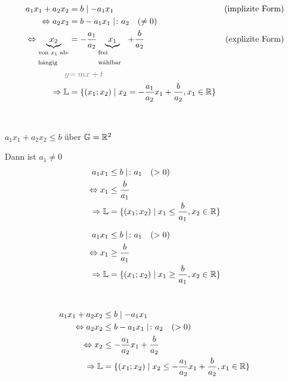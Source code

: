 \begin{enumerate}[A)]
	\clearpage
	\begin{align*}
	a_1x_1 + a_2x_2 &= b \mid - a_1x_1 &\text{(implizite Form)}\\
	\Leftrightarrow a_2x_2 &= b - a_1x_1 \mid \colon a_2\quad(\ne0)\\
	\Leftrightarrow \underbrace{x_2}_\text{\parbox{1.3cm}{von $x_1$ abhängig}} &= -\dfrac{a_1}{a_2}\underbrace{x_1}_\text{\parbox{1.2cm}{frei\\wählbar}} + \dfrac{b}{a_2} &\text{(explizite Form)}\\
	\gray{y}&\gray{=mx+t}\\
	\Rightarrow \L &= \{(x_1;x_2)\mid x_2= -\dfrac{a_1}{a_2}x_1 + \dfrac{b}{a_2},x_1\in\R\}
	\end{align*}
	
	\\
	\gray{\vdots}
	
	\clearpage
	 $a_1x_1 + a_2x_2 \le b$ über $\mathbb{G}=\mathbb{R}^2$
	
	 Dann ist $a_1\ne0$\\
	\begin{align*}
	a_1x_1 &\le b \mid \colon a_1\quad(>0)\\
	\Leftrightarrow x_1 &\le \dfrac{b}{a_1}\\
	\Rightarrow \mathbb{L} &= \{(x_1;x_2)\mid x_1\le\dfrac{b}{a_1},x_2\in\mathbb{R}\}
	\end{align*}
	
	\clearpage
	\begin{align*}
	a_1x_1 &\le b \mid \colon a_1\quad(>0)\\
	\Leftrightarrow x_1 &\ge \dfrac{b}{a_1}\\
	\Rightarrow \mathbb{L} &= \{(x_1;x_2)\mid x_1\ge\dfrac{b}{a_1},x_2\in\mathbb{R}\}
	\end{align*}
	
	\clearpage
	\\
	\begin{align*}
	a_1x_1 + a_2x_2 &\le b \mid - a_1x_1\\
	\Leftrightarrow a_2x_2 &\le b - a_1x_1 \mid \colon a_2\quad(>0)\\
	\Leftrightarrow x_2 &\le -\dfrac{a_1}{a_2}x_1 + \dfrac{b}{a_2}\\
	\Rightarrow \mathbb{L} &= \{(x_1;x_2)\mid x_2\le -\dfrac{a_1}{a_2}x_1 + \dfrac{b}{a_2},x_1\in\mathbb{R}\}
	\end{align*}
	

\end{enumerate}
